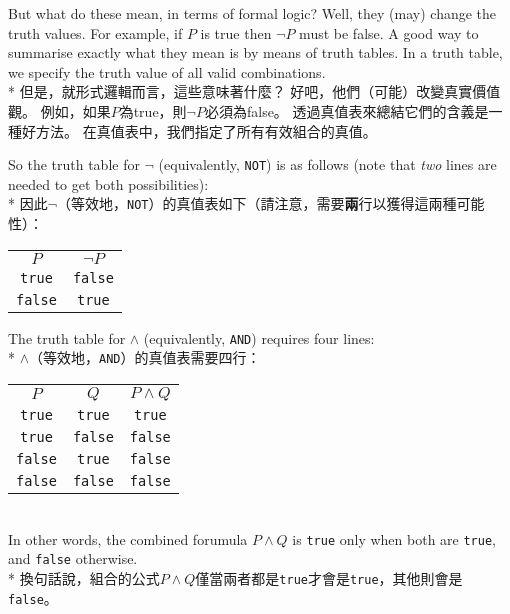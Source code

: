 \documentclass[]{article}
\begin{document}
{\color{gray}But what do these mean, in terms of formal logic? Well, they (may) change the truth values. For example, if $ P $ is true then $ \neg P $ must be false. A good way to summarise exactly what they mean is by means of truth tables. In a truth table, we specify the truth value of all valid combinations.}
\\*
{但是，就形式邏輯而言，這些意味著什麼？ 好吧，他們（可能）改變真實價值觀。 例如，如果$ P $為true，則$ \neg P $必須為false。 透過真值表來總結它們的含義是一種好方法。 在真值表中，我們指定了所有有效組合的真值。}

{\color{gray}So the truth table for $ \neg $ (equivalently, {\tt NOT}) is as follows  (note that \emph{two} lines are needed to get both possibilities):}
\\*
{因此$ \neg $（等效地，{\tt NOT}）的真值表如下（請注意，需要{\bfseries{兩}}行以獲得這兩種可能性）： }\\
\begin{tabular}{|c|c|}
$ P $ & $ \neg P $ \\
{\tt true} & {\tt false}	\\
{\tt false} & {\tt true}
\end{tabular}

{\color{gray}The truth table for $ \land $ (equivalently, {\tt AND}) requires four lines:}
\\*
{$ \land $（等效地，{\tt AND}）的真值表需要四行：} \\
\begin{tabular}{|c|c|c|}
	$ P $         & $ Q $           & $ P \land Q $ \\
	{\tt true}  &  {\tt true}   & {\tt true}          \\
 	{\tt true}  & {\tt false}	& {\tt false}       \\
	{\tt false} &  {\tt true}   & {\tt false}        \\
    {\tt false} & {\tt false}	& {\tt false}
\end{tabular} \\
{\color{gray}In other words, the combined forumula $ P\land Q $ is {\tt true} only when both are {\tt true}, and {\tt false} otherwise.}
\\*
{換句話說，組合的公式$ P \land Q $僅當兩者都是{\tt true}才會是{\tt true}，其他則會是{\tt false}。}
\end{document}
